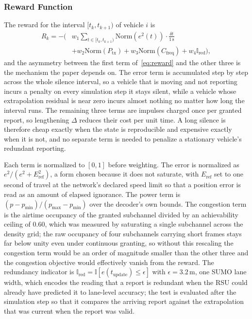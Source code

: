 \documentclass[journal]{IEEEtran}
\begin{document}
\subsubsection{Reward Function}
The reward for the interval $[t_k, t_{k+1})$ of vehicle $i$ is
\begin{equation}
\begin{split}
    R_k = -\Big( & w_1 \!\!\sum_{t \in [t_k, t_{k+1})}\!\! \mathrm{Norm}(e^2(t)) \cdot \frac{\delta t}{1\,\mathrm{s}} \\
    & + w_2 \mathrm{Norm}(P_{\mathrm{tx}}) + w_3 \mathrm{Norm}(C_{\mathrm{freq}}) + w_4 \mathbb{I}_{\mathrm{red}} \Big),
\end{split}
\label{eq:reward}
\end{equation}
and the asymmetry between the first term of~\eqref{eq:reward} and the other three is the mechanism the paper depends on. The error term is accumulated step by step across the whole silence interval, so a vehicle that is moving and not reporting incurs a penalty on every simulation step it stays silent, while a vehicle whose extrapolation residual is near zero incurs almost nothing no matter how long the interval runs. The remaining three terms are impulses charged once per granted report, so lengthening $\Delta$ reduces their cost per unit time. A long silence is therefore cheap exactly when the state is reproducible and expensive exactly when it is not, and no separate term is needed to penalize a stationary vehicle's redundant reporting.

Each term is normalized to $[0,1]$ before weighting. The error is normalized as $e^2/(e^2 + E_{\mathrm{ref}}^2)$, a form chosen because it does not saturate, with $E_{\mathrm{ref}}$ set to one second of travel at the network's declared speed limit so that a position error is read as an amount of elapsed ignorance. The power term is $(p - p_{\min})/(p_{\max} - p_{\min})$ over the decoder's own bounds. The congestion term is the airtime occupancy of the granted subchannel divided by an achievability ceiling of $0.60$, which was measured by saturating a single subchannel across the density grid; the raw occupancy of four subchannels carrying short frames stays far below unity even under continuous granting, so without this rescaling the congestion term would be an order of magnitude smaller than the other three and the congestion objective would effectively vanish from the reward. The redundancy indicator is $\mathbb{I}_{\mathrm{red}} = \mathbb{I}[e(t_{\mathrm{update}}) \leq \epsilon]$ with $\epsilon = 3.2$\,m, one SUMO lane width, which encodes the reading that a report is redundant when the RSU could already have predicted it to lane-level accuracy; the test is evaluated after the simulation step so that it compares the arriving report against the extrapolation that was current when the report was valid.
\end{document}
